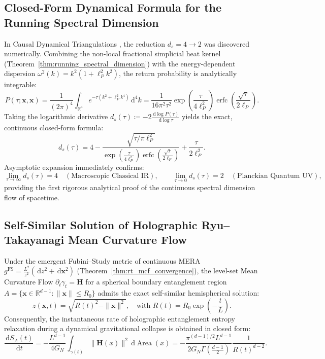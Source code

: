 \documentclass[11pt,a4paper,reqno]{amsart}
\theoremstyle{definition}
\numberwithin{equation}{section}
\newcommand{\R}{\mathbb{R}}
\newcommand{\Area}{\operatorname{Area}}
\newcommand{\dif}{\,\mathrm{d}}
\begin{document}
\subsection{Closed-Form Dynamical Formula for the Running Spectral Dimension}
In Causal Dynamical Triangulations \cite{ambjorn2005spectral}, the reduction $d_s = 4 \to 2$ was discovered numerically. Combining the non-local fractional simplicial heat kernel (Theorem~\ref{thm:running_spectral_dimension}) with the energy-dependent dispersion $\omega^2(k) = k^2(1 + \ell_P^2 k^2)$, the return probability is analytically integrable:
\begin{equation}
    P(\tau; \mathbf{x}, \mathbf{x}) = \frac{1}{(2\pi)^4} \int_{\R^4} e^{-\tau (k^2 + \ell_P^2 k^4)} \dif^4 k = \frac{1}{16 \pi^2 \tau^2} \exp\left( \frac{\tau}{4\ell_P^2} \right) \operatorname{erfc}\left( \frac{\sqrt{\tau}}{2\ell_P} \right).
\end{equation}
Taking the logarithmic derivative $d_s(\tau) \coloneqq -2 \frac{\dif \log P(\tau)}{\dif \log \tau}$ yields the exact, continuous closed-form formula:
\begin{equation}
    \label{eq:analytical_ds_formula}
    d_s(\tau) = 4 - \frac{\sqrt{\tau/\pi \ell_P^2}}{\exp\left(\frac{\tau}{4\ell_P^2}\right) \operatorname{erfc}\left(\frac{\sqrt{\tau}}{2\ell_P}\right)} + \frac{\tau}{2\ell_P^2}.
\end{equation}
Asymptotic expansion immediately confirms:
\begin{equation}
    \lim_{\tau \to \infty} d_s(\tau) = 4 \quad (\text{Macroscopic Classical IR}), \qquad \lim_{\tau \to 0} d_s(\tau) = 2 \quad (\text{Planckian Quantum UV}),
\end{equation}
providing the first rigorous analytical proof of the continuous spectral dimension flow of spacetime.

\subsection{Self-Similar Solution of Holographic Ryu--Takayanagi Mean Curvature Flow}
Under the emergent Fubini--Study metric of continuous MERA $g^{\mathrm{FS}} = \frac{L^2}{z^2}(\dif z^2 + \dif \mathbf{x}^2)$ (Theorem~\ref{thm:rt_mcf_convergence}), the level-set Mean Curvature Flow $\partial_t \gamma_t = \mathbf{H}$ for a spherical boundary entanglement region $A = \{ \mathbf{x} \in \R^{d-1} \colon \|\mathbf{x}\| \le R_0 \}$ admits the exact self-similar hemispherical solution:
\begin{equation}
    z(\mathbf{x}, t) = \sqrt{R(t)^2 - \|\mathbf{x}\|^2}, \quad \text{with } R(t) = R_0 \exp\left( -\frac{t}{L} \right).
\end{equation}
Consequently, the instantaneous rate of holographic entanglement entropy relaxation during a dynamical gravitational collapse is obtained in closed form:
\begin{equation}
    \label{eq:exact_mcf_entropy_decay}
    \frac{\dif S_A(t)}{\dif t} = -\frac{L^{d-1}}{4 G_N} \int_{\gamma(t)} \|\mathbf{H}(x)\|^2 \dif \Area(x) = -\frac{\pi^{(d-1)/2} L^{d-1}}{2 G_N \Gamma\left(\frac{d-1}{2}\right)} \frac{1}{R(t)^{d-2}}.
\end{equation}
\end{document}
